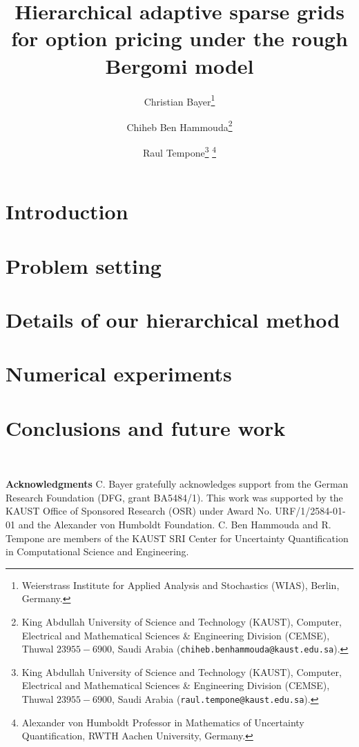 \documentclass[11pt]{article}
\title{Hierarchical adaptive sparse  grids for option pricing under the rough Bergomi model}
\author{Christian Bayer\thanks{
 Weierstrass Institute for Applied Analysis and Stochastics (WIAS),
 Berlin, Germany.}
        \and Chiheb Ben Hammouda\thanks{King Abdullah University of Science and Technology (KAUST), Computer, Electrical and Mathematical Sciences \& Engineering Division (CEMSE), Thuwal $23955-6900$, Saudi Arabia ({\tt chiheb.benhammouda@kaust.edu.sa}).} 
\and  Raul Tempone\thanks{King Abdullah University of Science and Technology (KAUST), Computer, Electrical and Mathematical Sciences \& Engineering Division (CEMSE), Thuwal $23955-6900$, Saudi Arabia ({\tt raul.tempone@kaust.edu.sa}).} \thanks{Alexander von Humboldt Professor in Mathematics of Uncertainty Quantification, RWTH Aachen University, Germany.}}
\begin{document}
\maketitle

\begin{abstract}
	  
\end{abstract}






\thispagestyle{plain}

\setcounter{tocdepth}{1}


 \section{Introduction}




 \section{Problem setting}\label{sec:Problem setting}




\section{Details of our hierarchical method}\label{sec:Details our approach and error bounds}





  \section{Numerical experiments}\label{sec:Numerical tests}




\section{Conclusions and future work}



\

\textbf{Acknowledgments} C. Bayer gratefully acknowledges support from the German Research Foundation (DFG, grant BA5484/1). This work was supported by the KAUST Office of Sponsored Research (OSR) under Award No. URF/1/2584-01-01 and the Alexander von Humboldt Foundation. C. Ben Hammouda and R. Tempone are members of the KAUST SRI Center for Uncertainty Quantification in Computational Science and Engineering. 





 




%






 

 

 
 
 
\end{document}
